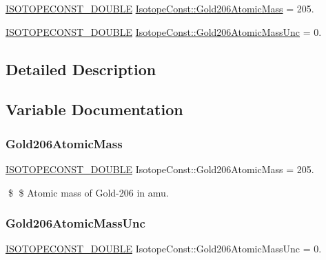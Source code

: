 \begin{DoxyCompactItemize}
\item 
\mbox{\hyperlink{group___isotope_const-_macros_ga8f45a7272ce02c0b4c65c44636ed719a}{I\+S\+O\+T\+O\+P\+E\+C\+O\+N\+S\+T\+\_\+\+D\+O\+U\+B\+LE}} \mbox{\hyperlink{group___isotope_const-_gold-_au206_gac018902483c8c7bc9db88fc3cd526206}{Isotope\+Const\+::\+Gold206\+Atomic\+Mass}} = 205.
\item 
\mbox{\hyperlink{group___isotope_const-_macros_ga8f45a7272ce02c0b4c65c44636ed719a}{I\+S\+O\+T\+O\+P\+E\+C\+O\+N\+S\+T\+\_\+\+D\+O\+U\+B\+LE}} \mbox{\hyperlink{group___isotope_const-_gold-_au206_ga71f8fb00a542505d8a7af9996c57bc5c}{Isotope\+Const\+::\+Gold206\+Atomic\+Mass\+Unc}} = 0.
\end{DoxyCompactItemize}


\subsection{Detailed Description}


\subsection{Variable Documentation}
\mbox{\label{group___isotope_const-_gold-_au206_gac018902483c8c7bc9db88fc3cd526206}} 
\subsubsection{\texorpdfstring{Gold206\+Atomic\+Mass}{Gold206AtomicMass}}
{\footnotesize\ttfamily \mbox{\hyperlink{group___isotope_const-_macros_ga8f45a7272ce02c0b4c65c44636ed719a}{I\+S\+O\+T\+O\+P\+E\+C\+O\+N\+S\+T\+\_\+\+D\+O\+U\+B\+LE}} Isotope\+Const\+::\+Gold206\+Atomic\+Mass = 205.}

\$ \$ Atomic mass of Gold-\/206 in amu. \mbox{\label{group___isotope_const-_gold-_au206_ga71f8fb00a542505d8a7af9996c57bc5c}} 
\subsubsection{\texorpdfstring{Gold206\+Atomic\+Mass\+Unc}{Gold206AtomicMassUnc}}
{\footnotesize\ttfamily \mbox{\hyperlink{group___isotope_const-_macros_ga8f45a7272ce02c0b4c65c44636ed719a}{I\+S\+O\+T\+O\+P\+E\+C\+O\+N\+S\+T\+\_\+\+D\+O\+U\+B\+LE}} Isotope\+Const\+::\+Gold206\+Atomic\+Mass\+Unc = 0.}

